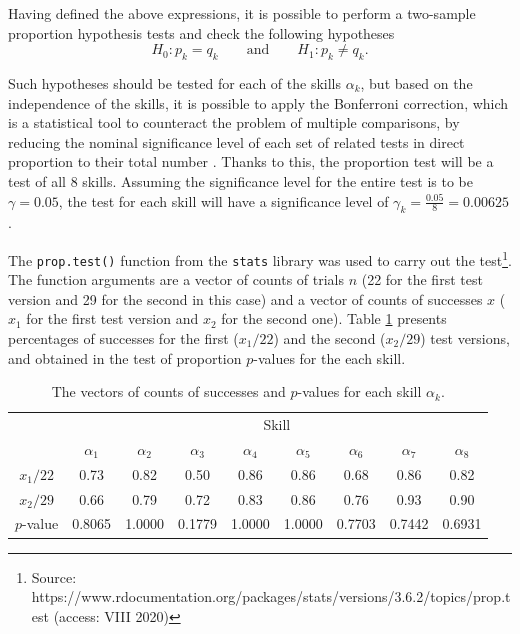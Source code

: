 \documentclass[english]{pwr_wmat_praca_dyplomowa}
\theoremstyle{plain}
\numberwithin{theorem}{chapter}
\theoremstyle{definition}
\numberwithin{theorem}{chapter}
\begin{document}
	Having defined the above expressions, it is possible to perform a two-sample proportion hypothesis tests \cite{proportion_test} and check the following hypotheses
	$$ H_0: p_k = q_k \qquad \text{and} \qquad H_1: p_k \neq q_k.$$
	
	Such hypotheses should be tested for each of the skills $\alpha_{k}$, but based on the independence of the skills, it is possible to apply the Bonferroni correction, which is a statistical tool to counteract the problem of multiple comparisons, by reducing the nominal significance level of each set of related tests in direct proportion to their total number \cite{bonferroni}. Thanks to this, the proportion test will be a test of all 8 skills. Assuming the significance level for the entire test is to be $\gamma = 0.05$, the test for each skill will have a significance level of $\gamma_k = \frac{0.05}{8} = 0.00625$. 
	
	The \texttt{prop.test()} function from the \texttt{stats} library was used to carry out the test\footnote{Source: https://www.rdocumentation.org/packages/stats/versions/3.6.2/topics/prop.test (access: VIII 2020)}. The function arguments are a vector of counts of trials $n$ (22 for the first test version and 29 for the second in this case) and a vector of counts of successes $x$ ($x_1$ for the first test version and $x_2$ for the second one). Table \ref{tab:p_values_groups_comparison} presents percentages of successes for the first ($x_1/22$) and the second ($x_2/29$) test versions, and obtained in the test of proportion $p$-values for the each skill.
	
	\begin{table}[H]
		\centering
		\begin{tabular}{c c c c c c c c c} 
			\hline
			{\rule{0pt}{3ex}} & \multicolumn{8}{c}{Skill} \\
			& $\alpha_1$ & $\alpha_2$ & $\alpha_3$ &  $\alpha_4$ & $\alpha_5$ & $\alpha_6$ & $\alpha_7$ & $\alpha_8$ \\
			\hline
			{\rule{0pt}{3ex}}$x_1/22$ & 0.73 & 0.82 & 0.50 & 0.86 & 0.86 & 0.68 & 0.86 & 0.82 \\
			$x_2/29$ & 0.66 & 0.79 & 0.72 & 0.83 & 0.86 & 0.76 & 0.93 & 0.90 \\
			$p$-value & 0.8065 & 1.0000 & 0.1779 & 1.0000 & 1.0000 & 0.7703 & 0.7442 & 0.6931 \\ [0.5ex] 
			\hline
		\end{tabular}
		\caption{The vectors of counts of successes and $p$-values for each skill $\alpha_{k}$.}
		\label{tab:p_values_groups_comparison} 
	\end{table}
	
\end{document}
